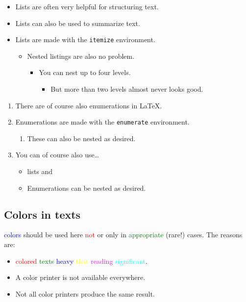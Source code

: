 \documentclass{llncs}
\begin{document}
\begin{itemize}
\item Lists are often very helpful for structuring text. \item Lists can also be used to summarize text.
\item Lists are made with the \texttt{itemize} environment.
\begin{itemize}
\item Nested listings are also no problem.
\begin{itemize}
\item You can nest up to four levels.
\begin{itemize}
\item But more than two levels almost never looks good.
\end{itemize}
\end{itemize}
\end{itemize}
\end{itemize}

\begin{enumerate}
\item There are of course also enumerations in \LaTeX.
\item Enumerations are made with the \texttt{enumerate} environment.
\begin{enumerate}
\item These can also be nested as desired.
\end{enumerate}
\item You can of course also use\dots
\begin{itemize}
\item lists and
\item Enumerations can be nested as desired.
\end{itemize}
\end{enumerate}

\subsection{Colors in texts}

\textcolor{blue}{colors} should be used here \textcolor{red}{not} or only in \textcolor{green}{appropriate} (rare!) cases. The reasons are:
\begin{itemize}
\item \textcolor{red}{colored} \textcolor{green}{texts} \textcolor{blue}{heavy} \textcolor{yellow}{that} \textcolor{magenta}{reading} \textcolor{cyan}{significant}.
\item A color printer is not available everywhere.
\item Not all color printers produce the same result.
\end{itemize}
\end{document}
